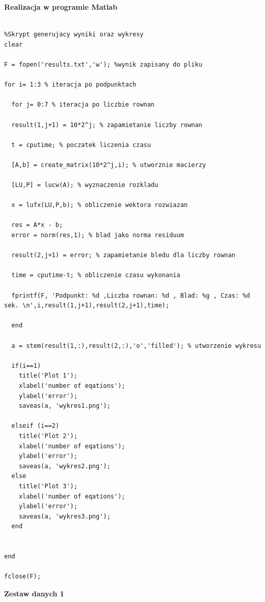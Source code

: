 \documentclass[a4paper, 11pt]{article}
\begin{document}
\textbf{Realizacja w programie Matlab}\\
\\
\begin{lstlisting}
%Skrypt generujacy wyniki oraz wykresy
clear

F = fopen('results.txt','w'); %wynik zapisany do pliku

for i= 1:3 % iteracja po podpunktach

  for j= 0:7 % iteracja po liczbie rownan
  
  result(1,j+1) = 10*2^j; % zapamietanie liczby rownan
  
  t = cputime; % poczatek liczenia czasu

  [A,b] = create_matrix(10*2^j,i); % utworznie macierzy

  [LU,P] = lucw(A); % wyznaczenie rozkladu
  
  x = lufx(LU,P,b); % obliczenie wektora rozwiazan
  
  res = A*x - b;
  error = norm(res,1); % blad jako norma residuum
  
  result(2,j+1) = error; % zapamietanie bledu dla liczby rownan
    
  time = cputime-t; % obliczenie czasu wykonania
  
  fprintf(F, 'Podpunkt: %d ,Liczba rownan: %d , Blad: %g , Czas: %d sek. \n',i,result(1,j+1),result(2,j+1),time);

  end
  
  a = stem(result(1,:),result(2,:),'o','filled'); % utworzenie wykresu
  
  if(i==1)
    title('Plot 1');
    xlabel('number of eqations');
    ylabel('error');
    saveas(a, 'wykres1.png');
  
  elseif (i==2) 
    title('Plot 2');
    xlabel('number of eqations');
    ylabel('error');
    saveas(a, 'wykres2.png');
  else
    title('Plot 3');
    xlabel('number of eqations');
    ylabel('error');
    saveas(a, 'wykres3.png');
  end
 

end

fclose(F);
\end{lstlisting}


\vspace{1cm}
\textbf{Zestaw danych 1}\\
\\
\end{document}

